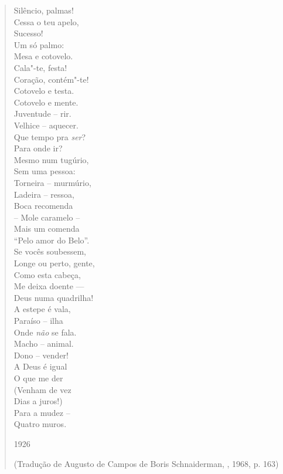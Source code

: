 \begin{verse}
Silêncio, palmas! \\
Cessa o teu apelo, \\
Sucesso! \\
Um só palmo: \\
Mesa e cotovelo. \\[8pt]
Cala"-te, festa! \\
Coração, contém"-te! \\
Cotovelo e testa. \\
Cotovelo e mente. \\[8pt]
Juventude -- rir. \\
Velhice -- aquecer. \\
Que tempo pra \emph{ser}? \\
Para onde ir? \\[8pt]
Mesmo num tugúrio, \\
Sem uma pessoa: \\
Torneira -- murmúrio, \\
Ladeira -- ressoa, \\[8pt]
Boca recomenda \\
-- Mole caramelo -- \\
Mais um comenda \\
``Pelo amor do Belo''. \\[8pt]
Se vocês soubessem, \\
Longe ou perto, gente, \\
Como esta cabeça, \\
Me deixa doente --- \\[8pt]
Deus numa quadrilha! \\
A estepe é vala, \\
Paraíso -- ilha \\
Onde \emph{não} se fala. \\[8pt]
Macho -- animal. \\
Dono -- vender! \\
A Deus é igual \\
O que me der \\[8pt]
(Venham de vez \\
Dias a juros!) \\
Para a mudez -- \\
Quatro muros. 

1926

(Tradução de Augusto de Campos de Boris Schnaiderman, , 1968, p. 163)

  \end{verse}


